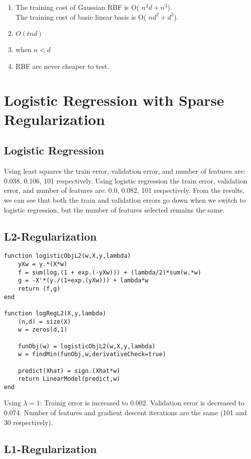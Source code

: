 \documentclass{article}
\def\enum#1{\begin{enumerate}#1\end{enumerate}}
\begin{document}
\enum{
\item  The training cost of Gaussian RBF is O( $n^2d+n^3$). \\
         The training cost of  basic linear basis is O( $nd^2+d^3$).
\item $O(tnd)$
\item  when $ n < d$
 \item  RBF are never cheaper to test.
}



\section{Logistic Regression with Sparse Regularization}

\subsection{Logistic Regression}

Using least squares the train error, validation error, and number of features are: 0.038, 0.106, 101 respectively. Using logistic regression the train error, validation error, and number of features are: 0.0, 0.082, 101 respectively. From the results, we can see that both the train and validation errors go down when we switch to logistic regression, but the number of features selected remains the same.

\subsection{L2-Regularization}

\begin{verbatim}
function logisticObjL2(w,X,y,lambda)
    yXw = y.*(X*w)
    f = sum(log.(1 + exp.(-yXw))) + (lambda/2)*sum(w.*w)
    g = -X'*(y./(1+exp.(yXw))) + lambda*w
    return (f,g)
end

function logRegL2(X,y,lambda)
    (n,d) = size(X)
    w = zeros(d,1)

    funObj(w) = logisticObjL2(w,X,y,lambda)
    w = findMin(funObj,w,derivativeCheck=true)

    predict(Xhat) = sign.(Xhat*w)
    return LinearModel(predict,w)
end
\end{verbatim}
Using $\lambda = 1$:
Trainig error is increased to 0.002.
Validation error is decreased to 0.074.
Number of features and gradient descent iterations are the same (101 and 30 respectively).

\subsection{L1-Regularization}
\end{document}
